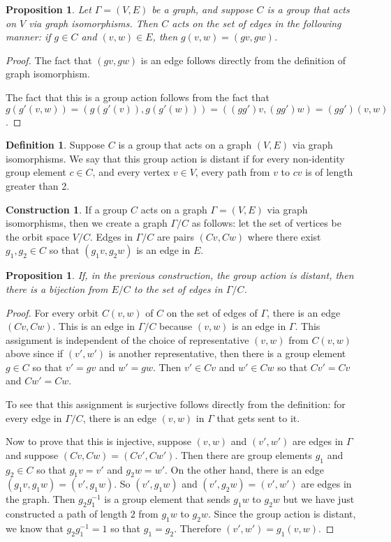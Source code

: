 \documentclass[12pt,twoside,singlespace]{article}
\numberwithin{equation}{section}
\newtheorem{prop}[equation]{Proposition}
\theoremstyle{definition}
\newtheorem{definition}[equation]{Definition}
\newtheorem{construction}[equation]{Construction}
\begin{document}
\begin{prop}
Let $\Gamma=(V,E)$ be a graph, and suppose $C$ is a group that acts on $V$ via graph isomorphisms.  Then $C$ acts on the set of edges in the following manner: if $g\in C$ and $(v,w)\in E$, then $g(v,w)=(gv,gw)$.
\end{prop}
\begin{proof}
The fact that $(gv,gw)$ is an edge follows directly from the definition of graph isomorphism.

The fact that this is a group action follows from the fact that $g(g'(v,w))=(g(g'(v)),g(g'(w)))=((gg')v,(gg')w)=(gg')(v,w)$.
\end{proof}

\begin{definition}
Suppose $C$ is a group that acts on a graph $(V,E)$ via graph isomorphisms.  We say that this group action is distant if for every non-identity group element $c\in C$, and every vertex $v\in V$, every path from $v$ to $cv$ is of length greater than 2.
\end{definition}

\begin{construction}
If a group $C$ acts on a graph $\Gamma=(V,E)$ via graph isomorphisms, then we create a graph $\Gamma/C$ as follows: let the set of vertices be the orbit space $V/C$.  Edges in $\Gamma/C$ are pairs $(Cv,Cw)$ where there exist $g_1, g_2\in C$ so that $(g_1v,g_2w)$ is an edge in $E$.
\end{construction}

\begin{prop}
\label{prop:distiso}
If, in the previous construction, the group action is distant, then there is a bijection from $E/C$ to the set of edges in $\Gamma/C$.
\end{prop}
\begin{proof}
For every orbit $C(v,w)$ of $C$ on the set of edges of $\Gamma$, there is an edge $(Cv,Cw)$.  This is an edge in $\Gamma/C$ because $(v,w)$ is an edge in $\Gamma$.  This assignment is independent of the choice of representative $(v,w)$ from $C(v,w)$ above since if $(v',w')$ is another representative, then there is a group element $g\in C$ so that $v'=gv$ and $w'=gw$.  Then $v'\in Cv$ and $w'\in Cw$ so that $Cv'=Cv$ and $Cw'=Cw$.

To see that this assignment is surjective follows directly from the definition: for every edge in $\Gamma/C$, there is an edge $(v,w)$ in $\Gamma$ that gets sent to it.

Now to prove that this is injective, suppose $(v,w)$ and $(v',w')$ are edges in $\Gamma$ and suppose $(Cv,Cw)=(Cv',Cw')$.  Then there are group elements $g_1$ and $g_2\in C$ so that $g_1v=v'$ and $g_2w=w'$.  On the other hand, there is an edge $(g_1v,g_1w)=(v',g_1w)$.  So $(v',g_1w)$ and $(v',g_2w)=(v',w')$ are edges in the graph.  Then $g_2g_1^{-1}$ is a group element that sends $g_1w$ to $g_2w$ but we have just constructed a path of length $2$ from $g_1w$ to $g_2w$.  Since the group action is distant, we know that $g_2g_1^{-1}=1$ so that $g_1=g_2$.  Therefore $(v',w')=g_1(v,w)$.
\end{proof}
\end{document}
